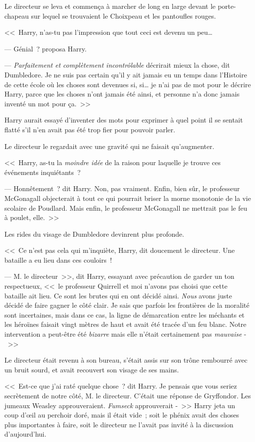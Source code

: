 Le directeur se leva et commença à marcher de long en large devant le porte-chapeau sur lequel se trouvaient le Choixpeau et les pantoufles rouges.

<<~Harry, n'as-tu pas l'impression que tout ceci est devenu un peu…

--- Génial~? proposa Harry.

--- \emph{Parfaitement et complètement incontrôlable} décrirait mieux la chose, dit Dumbledore. Je ne suis pas certain qu'il y ait jamais eu un temps dans l'Histoire de cette école où les choses sont devenues si, si… je n'ai pas de mot pour le décrire Harry, parce que les choses n'ont jamais été ainsi, et personne n'a donc jamais inventé un mot pour ça.~>>

Harry aurait essayé d'inventer des mots pour exprimer à quel point il se sentait flatté s'il n'en avait pas été trop fier pour pouvoir parler.

Le directeur le regardait avec une gravité qui ne faisait qu'augmenter.

<<~Harry, as-tu la \emph{moindre idée} de la raison pour laquelle je trouve ces événements inquiétants~?

--- Honnêtement~? dit Harry. Non, pas vraiment. Enfin, bien sûr, le professeur McGonagall objecterait à tout ce qui pourrait briser la morne monotonie de la vie scolaire de Poudlard. Mais enfin, le professeur McGonagall ne mettrait pas le feu à poulet, elle.~>>

Les rides du visage de Dumbledore devinrent plus profonde.

<<~Ce n'est pas cela qui m'inquiète, Harry, dit doucement le directeur. Une bataille a eu lieu dans ces couloirs~!

--- M. le directeur~>>, dit Harry, essayant avec précaution de garder un ton respectueux, <<~le professeur Quirrell et moi n'avons pas choisi que cette bataille ait lieu. Ce sont les brutes qui en ont décidé ainsi. \emph{Nous} avons juste décidé de faire gagner le côté clair. Je sais que parfois les frontières de la moralité sont incertaines, mais dans ce cas, la ligne de démarcation entre les méchants et les héroïnes faisait vingt mètres de haut et avait été tracée d'un feu blanc. Notre intervention a peut-être été \emph{bizarre} mais elle n'était certainement pas \emph{mauvaise} -~>>

Le directeur était revenu à son bureau, s'était assis sur son trône rembourré avec un bruit sourd, et avait recouvert son visage de ses mains.

<<~Est-ce que j'ai raté quelque chose~? dit Harry. Je pensais que vous seriez secrètement de notre côté, M. le directeur. C'était une réponse de Gryffondor. Les jumeaux Weasley approuveraient. \emph{Fumseck} approuverait -~>> Harry jeta un coup d'œil au perchoir doré, mais il était vide~; soit le phénix avait des choses plus importantes à faire, soit le directeur ne l'avait pas invité à la discussion d'aujourd'hui.

